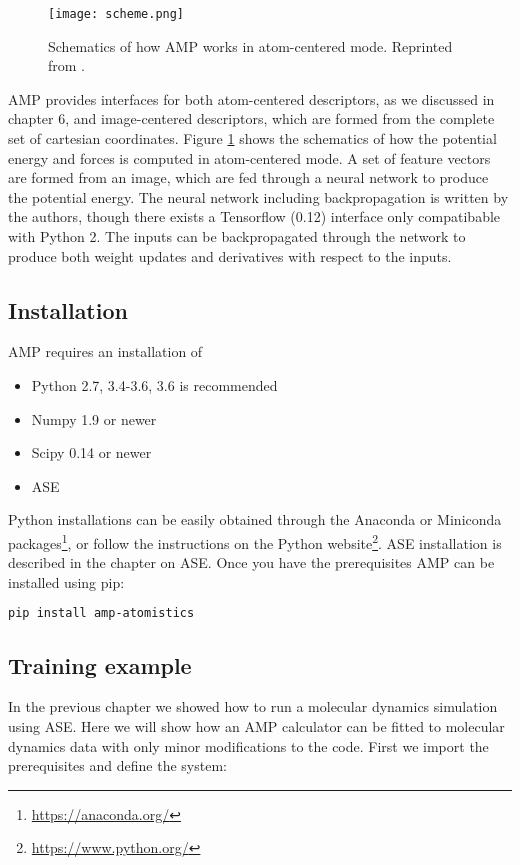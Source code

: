 \begin{figure}[H]
\centering
\texttt{[image: scheme.png]}
\caption{Schematics of how AMP works in atom-centered mode.
    Reprinted from \parencite[AMP paper]{khorshidi2016amp}.}
\label{fig:scheme}
\end{figure}

AMP provides interfaces for both atom-centered descriptors, as we
discussed in chapter 6, and image-centered descriptors,
which are formed from the complete set of cartesian coordinates.
Figure \ref{fig:scheme} shows the schematics of how the
potential energy and forces is computed in atom-centered mode.
A set of feature vectors are formed from an image, which are fed
through a neural network to produce the potential energy.
The neural network including backpropagation is written by the
authors, though there exists a Tensorflow (0.12) interface
only compatibable with Python 2.
The inputs can be backpropagated through the network
to produce both weight updates and derivatives with respect to
the inputs.

\subsection{Installation}
AMP requires an installation of

\begin{itemize}
    \item Python 2.7, 3.4-3.6, 3.6 is recommended
    \item Numpy 1.9 or newer
    \item Scipy 0.14 or newer
    \item ASE
\end{itemize}

Python installations can be easily obtained through the Anaconda 
or Miniconda packages\footnote{\url{https://anaconda.org/}},
or follow the instructions on the Python website\footnote{
\url{https://www.python.org/}}.
ASE installation is described in the chapter on ASE.
Once you have the prerequisites AMP can be installed using pip:

\begin{lstlisting}[language=bash]
pip install amp-atomistics
\end{lstlisting}

\subsection{Training example}
In the previous chapter we showed how to run a molecular dynamics
simulation using ASE. Here we will show how an AMP calculator
can be fitted to molecular dynamics data with only minor
modifications to the code.
First we import the prerequisites and define the system:

